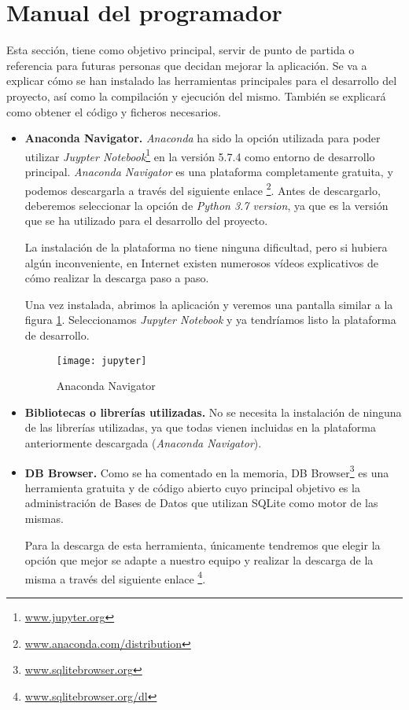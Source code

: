 \section{Manual del programador}

Esta sección, tiene como objetivo principal, servir de punto de partida o referencia para futuras personas que decidan mejorar la aplicación.
Se va a explicar cómo se han instalado las herramientas principales para el desarrollo del proyecto, así como la compilación y ejecución del mismo. También se explicará como obtener el código y ficheros necesarios.



\begin{itemize}
			\item \textbf{Anaconda Navigator.} \emph{Anaconda} ha sido la opción utilizada para poder utilizar \emph{Juypter Notebook}\footnote{\href {https://jupyter.org/}{www.jupyter.org}} en la versión 5.7.4 como entorno de desarrollo principal.
			\emph{Anaconda Navigator} es una plataforma completamente gratuita, y podemos descargarla a través del siguiente enlace 
\footnote{\href {https://www.anaconda.com/distribution/ }{www.anaconda.com/distribution}}.
Antes de descargarlo, deberemos seleccionar la opción de \emph{Python 3.7 version}, ya que es la versión que se ha utilizado para el desarrollo del proyecto.

La instalación de la plataforma no tiene ninguna dificultad, pero si hubiera algún inconveniente, en Internet existen numerosos vídeos explicativos de cómo realizar la descarga paso a paso.

Una vez instalada, abrimos la aplicación y veremos una pantalla similar a la figura \ref{fig:jupyter}. Seleccionamos \emph{Jupyter Notebook} y ya tendríamos listo la plataforma de desarrollo. 

\begin{figure}%
		\centering
		\texttt{[image: jupyter]}
		\caption{Anaconda Navigator}\label{fig:jupyter}
	\end{figure} 			
			
			\item \textbf{Bibliotecas o librerías utilizadas.} No se necesita la instalación de ninguna de las librerías utilizadas, ya que todas vienen incluidas en la plataforma anteriormente descargada (\emph{Anaconda Navigator}).
			
		
			\item \textbf{DB Browser.} Como se ha comentado en la memoria, DB Browser\footnote{\href{https://sqlitebrowser.org/}{www.sqlitebrowser.org}} es una herramienta gratuita y de código abierto cuyo principal objetivo es la administración de Bases de Datos que utilizan SQLite como motor de las mismas. 
			
			Para la descarga de esta herramienta, únicamente tendremos que elegir la opción que mejor se adapte a nuestro equipo y realizar la descarga de la misma a través del siguiente enlace \footnote{\href {https://sqlitebrowser.org/dl/}{www.sqlitebrowser.org/dl}}.
		
			\end{itemize}

